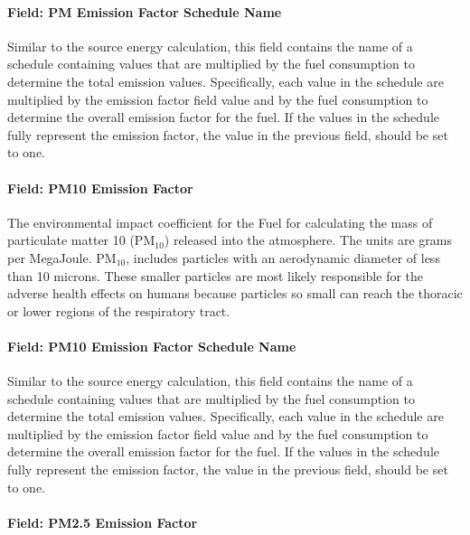 \paragraph{Field: PM Emission Factor Schedule Name}\label{field-pm-emission-factor-schedule-name}

Similar to the source energy calculation, this field contains the name of a schedule containing values that are multiplied by the fuel consumption to determine the total emission values. Specifically, each value in the schedule are multiplied by the emission factor field value and by the fuel consumption to determine the overall emission factor for the fuel. If the values in the schedule fully represent the emission factor, the value in the previous field, should be set to one.

\paragraph{Field: PM10 Emission Factor}\label{field-pm10-emission-factor}

The environmental impact coefficient for the Fuel for calculating the mass of particulate matter 10 (PM\(_{10}\)) released into the atmosphere. The units are grams per MegaJoule. PM\(_{10}\), includes particles with an aerodynamic diameter of less than 10 microns. These smaller particles are most likely responsible for the adverse health effects on humans because particles so small can reach the thoracic or lower regions of the respiratory tract.

\paragraph{Field: PM10 Emission Factor Schedule Name}\label{field-pm10-emission-factor-schedule-name}

Similar to the source energy calculation, this field contains the name of a schedule containing values that are multiplied by the fuel consumption to determine the total emission values. Specifically, each value in the schedule are multiplied by the emission factor field value and by the fuel consumption to determine the overall emission factor for the fuel. If the values in the schedule fully represent the emission factor, the value in the previous field, should be set to one.

\paragraph{Field: PM2.5 Emission Factor}\label{field-pm2.5-emission-factor}


